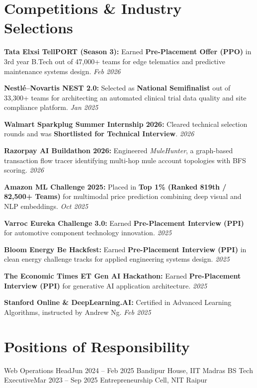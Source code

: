 \documentclass[letterpaper,10pt]{article}
\begin{document}
\section{Competitions \& Industry Selections}
 \begin{itemize}[leftmargin=0.15in, label={--}]
    \small{
      \item \textbf{Tata Elxsi TellPORT (Season 3):} Earned \textbf{Pre-Placement Offer (PPO)} in 3rd year B.Tech out of 47,000+ teams for edge telematics and predictive maintenance systems design. \hfill \emph{Feb 2026}
      \item \textbf{Nestl\'e--Novartis NEST 2.0:} Selected as \textbf{National Semifinalist} out of 33,300+ teams for architecting an automated clinical trial data quality and site compliance platform. \hfill \emph{Jan 2025}
      \item \textbf{Walmart Sparkplug Summer Internship 2026:} Cleared technical selection rounds and was \textbf{Shortlisted for Technical Interview}. \hfill \emph{2026}
      \item \textbf{Razorpay AI Buildathon 2026:} Engineered \emph{MuleHunter}, a graph-based transaction flow tracer identifying multi-hop mule account topologies with BFS scoring. \hfill \emph{2026}
      \item \textbf{Amazon ML Challenge 2025:} Placed in \textbf{Top 1\% (Ranked 819th / 82,500+ Teams)} for multimodal price prediction combining deep visual and NLP embeddings. \hfill \emph{Oct 2025}
      \item \textbf{Varroc Eureka Challenge 3.0:} Earned \textbf{Pre-Placement Interview (PPI)} for automotive component technology innovation. \hfill \emph{2025}
      \item \textbf{Bloom Energy Be Hackfest:} Earned \textbf{Pre-Placement Interview (PPI)} in clean energy challenge tracks for applied engineering systems design. \hfill \emph{2025}
      \item \textbf{The Economic Times ET Gen AI Hackathon:} Earned \textbf{Pre-Placement Interview (PPI)} for generative AI application architecture. \hfill \emph{2025}
      \item \textbf{Stanford Online \& DeepLearning.AI:} Certified in Advanced Learning Algorithms, instructed by Andrew Ng. \hfill \emph{Feb 2025}
    }
 \end{itemize}

\section{Positions of Responsibility}
  \resumeSubHeadingListStart
    \resumeSubheading
      {Web Operations Head}{Jun 2024 -- Feb 2025}
      {Bandipur House, IIT Madras BS}{}
      \resumeItemListStart
      \resumeItemListEnd
    \resumeSubheading
      {Tech Executive}{Mar 2023 -- Sep 2025}
      {Entrepreneurship Cell, NIT Raipur}{}
      \resumeItemListStart
      \resumeItemListEnd
  \resumeSubHeadingListEnd
\end{document}
